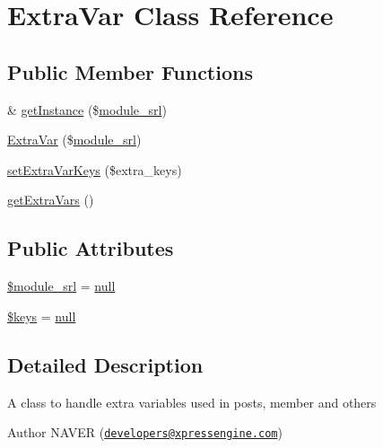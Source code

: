 \hypertarget{classExtraVar}{}\section{Extra\+Var Class Reference}
\label{classExtraVar}
\subsection*{Public Member Functions}
\begin{DoxyCompactItemize}
\item 
\& \hyperlink{classExtraVar_ad65adf9c2fc8c077dd2764b4faf2d8c4}{get\+Instance} (\$\hyperlink{ko_8install_8php_a370bb6450fab1da3e0ed9f484a38b761}{module\+\_\+srl})
\item 
\hyperlink{classExtraVar_aa1f0e0f9cf917fde76581b5bf66afe18}{Extra\+Var} (\$\hyperlink{ko_8install_8php_a370bb6450fab1da3e0ed9f484a38b761}{module\+\_\+srl})
\item 
\hyperlink{classExtraVar_a8e5bb2ebfd6da9d82e78596b5e760e58}{set\+Extra\+Var\+Keys} (\$extra\+\_\+keys)
\item 
\hyperlink{classExtraVar_abe624f7d58678487a37176fe1175a060}{get\+Extra\+Vars} ()
\end{DoxyCompactItemize}
\subsection*{Public Attributes}
\begin{DoxyCompactItemize}
\item 
\hyperlink{classExtraVar_a3a84e48f2cdf01660b2844244f8fd9f7}{\$module\+\_\+srl} = \hyperlink{modernizr_8min_8js_a286f9ec831c5e676eeb493248eab9575}{null}
\item 
\hyperlink{classExtraVar_ac2aee2ca8a3299c952ba8f155eaadc64}{\$keys} = \hyperlink{modernizr_8min_8js_a286f9ec831c5e676eeb493248eab9575}{null}
\end{DoxyCompactItemize}


\subsection{Detailed Description}
A class to handle extra variables used in posts, member and others

\begin{DoxyAuthor}{Author}
N\+A\+V\+ER (\href{mailto:developers@xpressengine.com}{\tt developers@xpressengine.\+com}) 
\end{DoxyAuthor}


